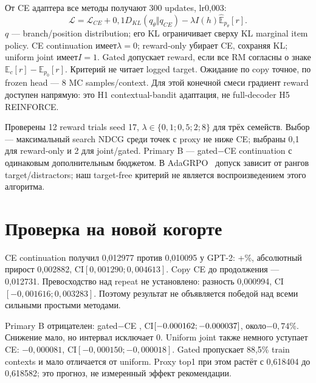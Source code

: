 \documentclass[10pt,a4paper,twocolumn]{article}
\begin{document}
От CE адаптера все методы получают 300 updates, lr0{,}003:
\begin{equation}
\mathcal L=\mathcal L_{CE}+0{,}1D_{KL}(q_\theta\Vert q_{CE})
-\lambda I(h)\widehat{\mathbb E}_{p_\theta}[r].
\end{equation}
$q$ --- branch/position distribution; его KL ограничивает сверху KL
marginal item policy. CE continuation имеет$\lambda=0$;
reward-only убирает CE, сохраняя KL; uniform joint имеет$I=1$.
Gated допускает reward, если все RM согласны о знаке
$\mathbb E_c[r]-\mathbb E_{p_0}[r]$. Критерий не читает logged target.
Ожидание по copy точное, по frozen head --- 8 MC samples/context.
Для этой конечной смеси градиент reward доступен напрямую:
это H1 contextual-bandit адаптация, не full-decoder H5 REINFORCE.

Проверены 12 reward trials seed 17,
$\lambda\in\{0{,}1;0{,}5;2;8\}$ для трёх семейств.
Выбор --- максимальный search NDCG среди точек с proxy не ниже CE;
выбраны 0{,}1 для reward-only и 2 для joint/gated. Primary B --- gated$-$CE
continuation с одинаковым дополнительным бюджетом.
В AdaGRPO~\cite{ada} допуск зависит от рангов target/distractors;
наш target-free критерий не является воспроизведением этого алгоритма.



\section{Проверка на новой когорте}
\begin{table}[t]
\centering\small\setlength{\tabcolsep}{3pt}
\caption{Внешний test B: \BUsers{} активных UID, \BQueries{} запросов.
Сравнивать абсолютные значения между таблицами A/B как эффект метода нельзя.}
\label{tab:b}
\end{table}

CE continuation получил 0{,}012977 против 0{,}010095 у GPT-2:
+\Gain\%, абсолютный прирост 0{,}002882,
CI$[0{,}001290;0{,}004613]$. Copy CE до продолжения --- 0{,}012731.
Превосходство над repeat не установлено: разность 0{,}000994,
CI$[-0{,}001616;0{,}003283]$. Поэтому результат не объявляется победой
над всеми сильными простыми методами.

Primary B отрицателен: gated$-$CE \BDelta{}, CI$[-0.000162;-0.000037]$,
около$-0{,}74\%$. Снижение мало, но интервал исключает 0.
Uniform joint также немного уступает CE: $-0{,}000081$,
CI$[-0{,}000150;-0{,}000018]$. Gated пропускает 88{,}5\% train contexts
и мало отличается от uniform. Proxy top1 при этом растёт
с 0{,}618404 до 0{,}618582; это прогноз, не измеренный эффект рекомендации.
\end{document}
